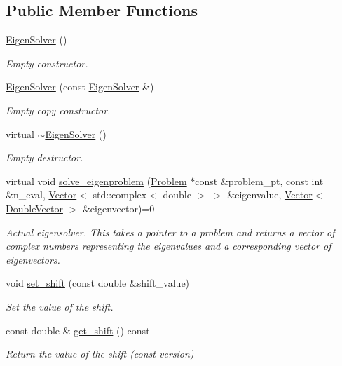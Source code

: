 \subsection*{Public Member Functions}
\begin{DoxyCompactItemize}
\item 
\hyperlink{classoomph_1_1EigenSolver_a677b40c853c649f87b52815a6fadb2c6}{Eigen\+Solver} ()
\begin{DoxyCompactList}\small\item\em Empty constructor. \end{DoxyCompactList}\item 
\hyperlink{classoomph_1_1EigenSolver_a2ab3e3ffc0a171dd5299d12d8be5d1b2}{Eigen\+Solver} (const \hyperlink{classoomph_1_1EigenSolver}{Eigen\+Solver} \&)
\begin{DoxyCompactList}\small\item\em Empty copy constructor. \end{DoxyCompactList}\item 
virtual \hyperlink{classoomph_1_1EigenSolver_a05742af42f53f3904b06c7650e3c10c5}{$\sim$\+Eigen\+Solver} ()
\begin{DoxyCompactList}\small\item\em Empty destructor. \end{DoxyCompactList}\item 
virtual void \hyperlink{classoomph_1_1EigenSolver_a6a6b09612ce16457b26fa0cfe996fa71}{solve\+\_\+eigenproblem} (\hyperlink{classoomph_1_1Problem}{Problem} $\ast$const \&problem\+\_\+pt, const int \&n\+\_\+eval, \hyperlink{classoomph_1_1Vector}{Vector}$<$ std\+::complex$<$ double $>$ $>$ \&eigenvalue, \hyperlink{classoomph_1_1Vector}{Vector}$<$ \hyperlink{classoomph_1_1DoubleVector}{Double\+Vector} $>$ \&eigenvector)=0
\begin{DoxyCompactList}\small\item\em Actual eigensolver. This takes a pointer to a problem and returns a vector of complex numbers representing the eigenvalues and a corresponding vector of eigenvectors. \end{DoxyCompactList}\item 
void \hyperlink{classoomph_1_1EigenSolver_a8ab55677b39f98ed8ddb1b1ae682f07b}{set\+\_\+shift} (const double \&shift\+\_\+value)
\begin{DoxyCompactList}\small\item\em Set the value of the shift. \end{DoxyCompactList}\item 
const double \& \hyperlink{classoomph_1_1EigenSolver_ad468f4b075f09cee5efd6ac726ecad6e}{get\+\_\+shift} () const
\begin{DoxyCompactList}\small\item\em Return the value of the shift (const version) \end{DoxyCompactList}\end{DoxyCompactItemize}
